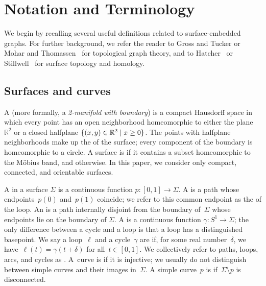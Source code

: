 \documentclass[11pt,twoside]{article}
\def\Real{\mathbb{R}}
\begin{document}
\color{Black}

\section{Notation and Terminology}
\label{sec:prelims}




We begin by recalling several useful definitions related to surface-embedded graphs.  For further background, we refer the reader to Gross and Tucker \cite{gt-tgt-01} or Mohar and Thomassen~\cite{mt-gs-01} for topological graph theory, and to Hatcher~\cite{h-at-02} or Stillwell~\cite{s-ctcgt-93} for surface topology and homology.



\subsection{Surfaces and curves}
\label{SS:surfaces}

A  (more formally, a \emph{2-manifold with boundary}) is a compact Hausdorff space in which every point has an open neighborhood homeomorphic to either the plane $\Real^2$ or a closed halfplane $\set{(x,y)\in \Real^2\mid x\ge 0}$.  The points with halfplane neighborhoods make up the  of the surface; every component of the boundary is homeomorphic to a circle.
A surface is  if it contains a subset homeomorphic to
the M\"obius band, and  otherwise. In this paper, we consider only compact, connected, and orientable surfaces.

A  in a surface $\Sigma$ is a continuous function $p\colon [0,1]\to\Sigma$.
A  is a path whose endpoints~$p(0)$ and~$p(1)$ coincide;
we refer to this common endpoint as the  of the loop.
An  is a path internally disjoint from the boundary of~$\Sigma$
whose endpoints lie on the boundary of $\Sigma$.
A  is a continuous function $\gamma\colon S^1\to\Sigma$;
the only difference between a cycle and a loop is that a loop has a
distinguished basepoint.
We say a loop~$\ell$ and a cycle~$\gamma$ are  if, for some
real number~$\delta$, we have~$\ell(t) = \gamma(t + \delta)$ for
all~$t \in [0,1]$.
We collectively refer to paths, loops, arcs, and cycles as .
A~curve is  if it is injective; we usually do not distinguish between simple curves and their images in~$\Sigma$.
A simple curve~$p$ is  if~$\Sigma \setminus p$ is disconnected.
\end{document}
